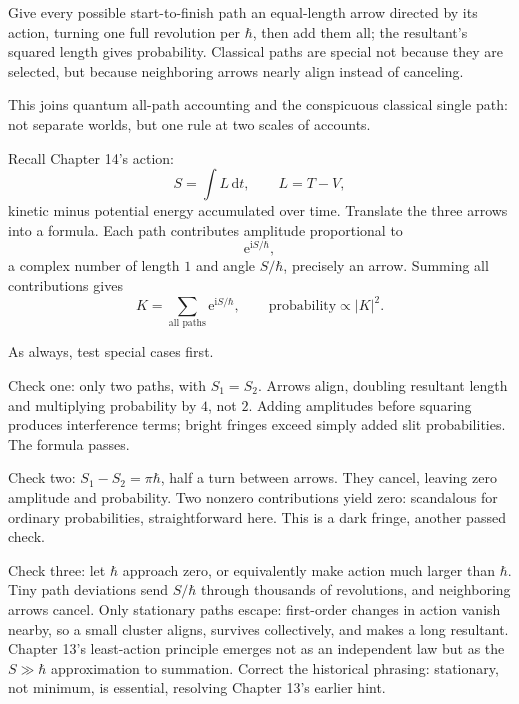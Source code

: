 
\begin{oneline}
Give every possible start-to-finish path an equal-length arrow directed by its action, turning one full revolution per \(\hbar\), then add them all; the resultant's squared length gives probability. Classical paths are special not because they are selected, but because neighboring arrows nearly align instead of canceling.
\end{oneline}

This joins quantum all-path accounting and the conspicuous classical single path: not separate worlds, but one rule at two scales of accounts.


Recall Chapter 14's action:
\[
S=\int L\,\mathrm{d}t,\qquad L=T-V,
\]
kinetic minus potential energy accumulated over time. Translate the three arrows into a formula. Each path contributes amplitude proportional to
\[
\mathrm{e}^{\mathrm{i}S/\hbar},
\]
a complex number of length \(1\) and angle \(S/\hbar\), precisely an arrow. Summing all contributions gives
\[
K=\sum_{\text{all paths}}\mathrm{e}^{\mathrm{i}S/\hbar},
\qquad\text{probability}\propto |K|^2 .
\]

As always, test special cases first.

Check one: only two paths, with \(S_1=S_2\). Arrows align, doubling resultant length and multiplying probability by \(4\), not \(2\). Adding amplitudes before squaring produces interference terms; bright fringes exceed simply added slit probabilities. The formula passes.

Check two: \(S_1-S_2=\pi\hbar\), half a turn between arrows. They cancel, leaving zero amplitude and probability. Two nonzero contributions yield zero: scandalous for ordinary probabilities, straightforward here. This is a dark fringe, another passed check.

Check three: let \(\hbar\) approach zero, or equivalently make action much larger than \(\hbar\). Tiny path deviations send \(S/\hbar\) through thousands of revolutions, and neighboring arrows cancel. Only stationary paths escape: first-order changes in action vanish nearby, so a small cluster aligns, survives collectively, and makes a long resultant. Chapter 13's least-action principle emerges not as an independent law but as the \(S\gg\hbar\) approximation to summation. Correct the historical phrasing: stationary, not minimum, is essential, resolving Chapter 13's earlier hint.

